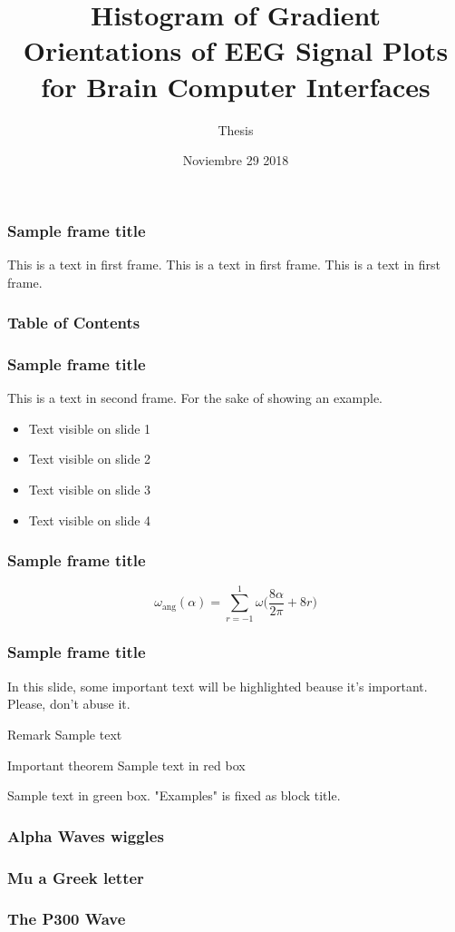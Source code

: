 \documentclass{beamer}
\title[HIST of EEG for BCI] %
{Histogram of Gradient Orientations of EEG Signal Plots for Brain Computer Interfaces}
\subtitle{Thesis}
\author[Ramele, Rodrigo]{ %
\usebox{\authbox}
}
\institute[ITBA] %
{
  Doctorado en Ingeniería en Informática\\
  Instituto Tecnológico de Buenos Aires
}
\date[Nov 29, 2018] %
{Noviembre 29 2018}
\begin{document}
 
\frame{\titlepage}
 
\begin{frame}
\frametitle{Sample frame title}
This is a text in first frame. This is a text in first frame. This is a text in first frame.
\end{frame}
 
\begin{frame}
\frametitle{Table of Contents}
\tableofcontents
\end{frame} 

\begin{frame}
\frametitle{Sample frame title}
This is a text in second frame. 
For the sake of showing an example.
 
\begin{itemize}
 \item<1-> Text visible on slide 1
 \item<2-> Text visible on slide 2
 \item<3> Text visible on slide 3
 \item<4-> Text visible on slide 4
\end{itemize}
 
\end{frame}

\begin{frame}
\frametitle{Sample frame title}
\begin{equation}
 \omega_\mathrm{ang}(\alpha) = \sum_{r=-1}^{1} \omega \bigg ( \frac{8\alpha}{2\pi} + 8r \bigg )
\label{eq:wang}
\end{equation}
\end{frame}

\begin{frame}
\frametitle{Sample frame title}
 
In this slide, some important text will be
\alert{highlighted} beause it's important.
Please, don't abuse it.
 
\begin{block}{Remark}
Sample text
\end{block}
 
\begin{alertblock}{Important theorem}
Sample text in red box
\end{alertblock}
 
\begin{examples}
Sample text in green box. "Examples" is fixed as block title.
\end{examples}
\end{frame}



\begin{frame}
\frametitle{Alpha Waves wiggles}


\end{frame}

\begin{frame}
\frametitle{Mu a Greek letter}


\end{frame}


\begin{frame}
\frametitle{The P300 Wave}


\end{frame}
\end{document}
